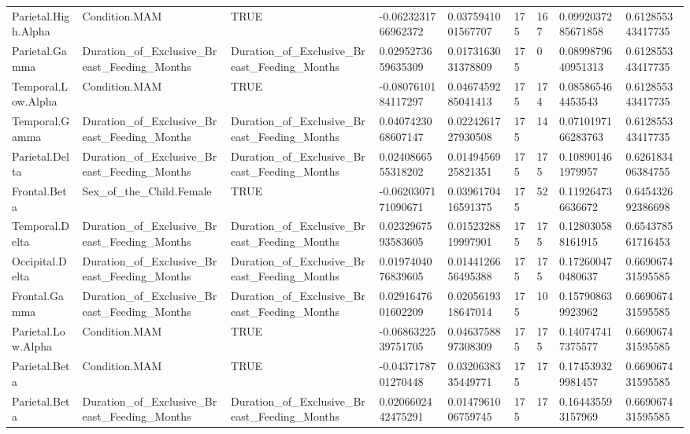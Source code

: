 \begin{longtable}{lllllllll}
Parietal.High.Alpha & Condition.MAM & TRUE & -0.0623231766962372 & 0.0375941001567707 & 175 & 167 & 0.0992037285671858 & 0.612855343417735 \\
Parietal.Gamma & Duration\_of\_Exclusive\_Breast\_Feeding\_Months & Duration\_of\_Exclusive\_Breast\_Feeding\_Months & 0.0295273659635309 & 0.0173163031378809 & 175 & 0 & 0.0899879640951313 & 0.612855343417735 \\
Temporal.Low.Alpha & Condition.MAM & TRUE & -0.0807610184117297 & 0.0467459285041413 & 175 & 174 & 0.085865464453543 & 0.612855343417735 \\
Temporal.Gamma & Duration\_of\_Exclusive\_Breast\_Feeding\_Months & Duration\_of\_Exclusive\_Breast\_Feeding\_Months & 0.0407423068607147 & 0.0224261727930508 & 175 & 14 & 0.0710197166283763 & 0.612855343417735 \\
Parietal.Delta & Duration\_of\_Exclusive\_Breast\_Feeding\_Months & Duration\_of\_Exclusive\_Breast\_Feeding\_Months & 0.0240866555318202 & 0.0149456925821351 & 175 & 175 & 0.108901461979957 & 0.626183406384755 \\
Frontal.Beta & Sex\_of\_the\_Child.Female & TRUE & -0.0620307171090671 & 0.0396170416591375 & 175 & 52 & 0.119264736636672 & 0.645432692386698 \\
Temporal.Delta & Duration\_of\_Exclusive\_Breast\_Feeding\_Months & Duration\_of\_Exclusive\_Breast\_Feeding\_Months & 0.0232967593583605 & 0.0152328819997901 & 175 & 175 & 0.128030588161915 & 0.654378561716453 \\
Occipital.Delta & Duration\_of\_Exclusive\_Breast\_Feeding\_Months & Duration\_of\_Exclusive\_Breast\_Feeding\_Months & 0.0197404076839605 & 0.0144126656495388 & 175 & 175 & 0.172600470480637 & 0.669067431595585 \\
Frontal.Gamma & Duration\_of\_Exclusive\_Breast\_Feeding\_Months & Duration\_of\_Exclusive\_Breast\_Feeding\_Months & 0.0291647601602209 & 0.0205619318647014 & 175 & 10 & 0.157908639923962 & 0.669067431595585 \\
Parietal.Low.Alpha & Condition.MAM & TRUE & -0.0686322539751705 & 0.0463758897308309 & 175 & 175 & 0.140747417375577 & 0.669067431595585 \\
Parietal.Beta & Condition.MAM & TRUE & -0.0437178701270448 & 0.0320638335449771 & 175 & 17 & 0.174539329981457 & 0.669067431595585 \\
Parietal.Beta & Duration\_of\_Exclusive\_Breast\_Feeding\_Months & Duration\_of\_Exclusive\_Breast\_Feeding\_Months & 0.0206602442475291 & 0.0147961006759745 & 175 & 17 & 0.164435593157969 & 0.669067431595585 \\

\end{longtable}
